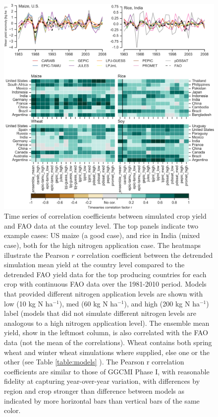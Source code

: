 \documentclass[gmd, manuscript]{copernicus} %
\begin{document}
{\begin{figure}[ht]
    \centering
    \includegraphics[width=14cm]{figures/Agformet_validation.png}
    \caption{Time series of correlation coefficients between simulated crop yield and FAO data \citep{FAOSTAT} at the country level. 
    The top panels indicate two example cases: US maize (a good case), and rice in India (mixed case), both for the high nitrogen application case. 
    The heatmaps illustrate the Pearson $r$ correlation coefficient between the detrended simulation mean yield at the country level compared to the detrended FAO yield data for the top producing countries for each crop with continuous FAO data over the 1981-2010 period. 
    Models that provided different nitrogen application levels are shown with low (10 kg N ha$^{-1}$), med (60 kg N ha$^{-1}$), and high (200 kg N ha$^{-1}$) label (models that did not simulate different nitrogen levels are analogous to a high nitrogen application level). 
    The ensemble mean yield, show in the leftmost column, is also correlated with the FAO data (not the mean of the correlations). 
    Wheat contains both spring wheat and winter wheat simulations where supplied, else one or the other (see Table \ref{table:models} ). 
    The Pearson r correlation coefficients are similar to those of GGCMI Phase I, with reasonable fidelity at capturing year-over-year variation, with differences by region and crop stronger than difference between models as indicated by more horizontal bars than vertical bars of the same color.}
    \label{fig:simulation_val}
\end{figure}

}
\end{document}
